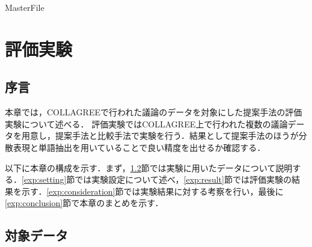 \expandafter\ifx\csname MasterFile\endcsname\relax
\def\SubFile{hoge}


\setcounter{chapter}{4}
\fi
\cleardoublepage
\chapter{評価実験}
\label{exp:chapter}

\section{序言}
\label{exp:introduction}
本章では，COLLAGREEで行われた議論のデータを対象にした提案手法の評価実験について述べる．
評価実験ではCOLLAGREE上で行われた複数の議論データを用意し，提案手法と比較手法で実験を行う．結果として提案手法のほうが分散表現と単語抽出を用いていることで良い精度を出せるか確認する．

以下に本章の構成を示す．まず，\ref{exp:data}節では実験に用いたデータについて説明する．\ref{exp:setting}節では実験設定について述べ，\ref{exp:result}節では評価実験の結果を示す．\ref{exp:consideration}節では実験結果に対する考察を行い，最後に\ref{exp:conclusion}節で本章のまとめを示す．

\clearpage
\section{対象データ}
\label{exp:data}
